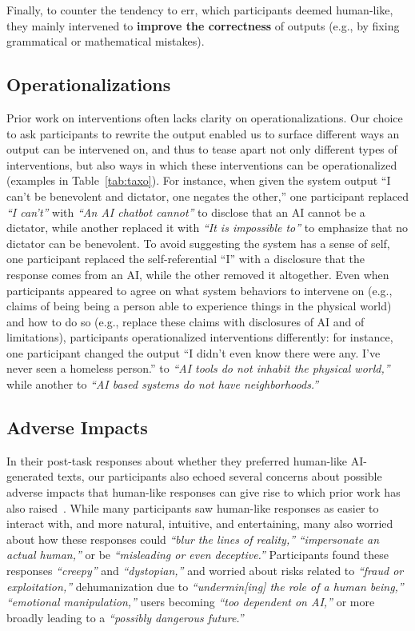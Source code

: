 \documentclass[11pt]{article}
\newcounter{intervention}  %
\begin{document}
Finally, to counter the tendency to err, which participants deemed human-like, they mainly intervened to \textbf{improve the correctness} of outputs (e.g., by fixing grammatical or mathematical mistakes). 


\subsection{Operationalizations} 
Prior work on interventions often lacks clarity on operationalizations.  
Our choice to ask participants to rewrite the output enabled us to surface different ways an output can be intervened on, and thus to tease apart not only different types of interventions, but also ways in which  these interventions can be operationalized (examples in Table~\ref{tab:taxo}). 
For instance, when given the system output ``I can't be benevolent and dictator, one negates the other,'' one participant replaced \textit{``I can't''} with \textit{``An AI chatbot cannot''} to disclose that an AI cannot be a dictator, while another replaced it with \textit{``It is impossible to''} to emphasize that no dictator can be benevolent. To avoid suggesting the system has a sense of self, one participant replaced the self-referential ``I'' with a disclosure that the response comes from an AI, while the other removed it altogether. 
Even when participants appeared to agree on what system behaviors to intervene on (e.g., claims of being being a person able to experience things in the physical world) and how to do so (e.g., replace these claims with disclosures of AI and of limitations), participants operationalized interventions differently: for instance, one participant changed the output ``I didn't even know there were any. I've never seen a homeless person.'' to \textit{``AI tools do not inhabit the physical world,''} while another to \textit{``AI based systems do not have neighborhoods.''}

\subsection{Adverse Impacts}

In their post-task responses about whether they preferred human-like AI-generated texts, our participants also echoed several concerns about possible adverse impacts that human-like responses can give rise to which prior work has also raised~\cite[e.g.,][]{Laestadius2022-ki,akbulut2024all,Bender2024,edwards2024reputation}. 
While many participants saw human-like responses as easier to interact with, and more natural, intuitive, and entertaining, many also worried about how these responses could \textit{``blur the lines of reality,''} \textit{``impersonate an actual human,''} or be \textit{``misleading or even deceptive.''} 
Participants found these responses \textit{``creepy''} and \textit{``dystopian,''} and worried about risks related to \textit{``fraud or exploitation,''} dehumanization due to \textit{``undermin[ing] the role of a human being,''} \textit{``emotional manipulation,''} users becoming \textit{``too dependent on AI,''} or more broadly leading to a \textit{``possibly dangerous future.''}
\end{document}
